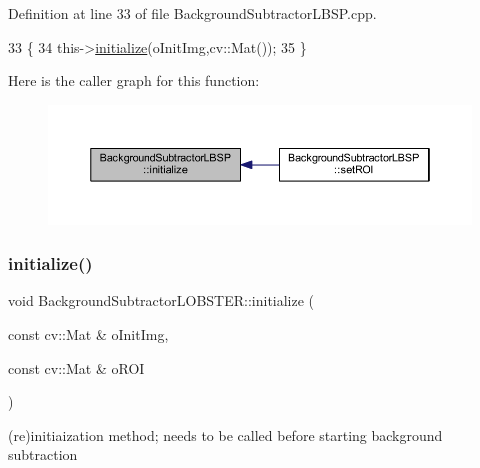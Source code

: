 Definition at line 33 of file Background\+Subtractor\+L\+B\+S\+P.\+cpp.


\begin{DoxyCode}
33                                                                \{
34     this->\mbox{\hyperlink{class_background_subtractor_l_b_s_p_ac6b854f94414497b143375d4a0ae8b6f}{initialize}}(oInitImg,cv::Mat());
35 \}
\end{DoxyCode}
Here is the caller graph for this function\+:
\nopagebreak
\begin{figure}[H]
\begin{center}
\leavevmode
\includegraphics[width=350pt]{class_background_subtractor_l_b_s_p_ac6b854f94414497b143375d4a0ae8b6f_icgraph}
\end{center}
\end{figure}
\mbox{\label{class_background_subtractor_l_o_b_s_t_e_r_a452bea31dcbd2e10efc701cc2cd25776}} 
\subsubsection{\texorpdfstring{initialize()}{initialize()}\hspace{0.1cm}{\footnotesize\ttfamily [2/2]}}
{\footnotesize\ttfamily void Background\+Subtractor\+L\+O\+B\+S\+T\+E\+R\+::initialize (\begin{DoxyParamCaption}\item[{const cv\+::\+Mat \&}]{o\+Init\+Img,  }\item[{const cv\+::\+Mat \&}]{o\+R\+OI }\end{DoxyParamCaption})\hspace{0.3cm}{\ttfamily [virtual]}}



(re)initiaization method; needs to be called before starting background subtraction 



